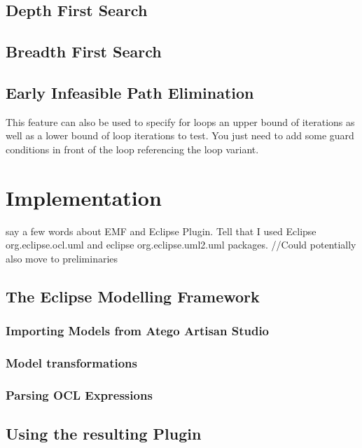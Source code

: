 \subsection{Depth First Search}
\subsection{Breadth First Search}
\subsection{Early Infeasible Path Elimination}
This feature can also be used to specify for loops an upper bound of iterations as well as a lower bound of loop iterations to test. You just need to add some guard conditions in front of the loop referencing the loop variant.
\section{Implementation}
say a few words about EMF and Eclipse Plugin. Tell that I used Eclipse org.eclipse.ocl.uml and eclipse org.eclipse.uml2.uml packages. //Could potentially also move to preliminaries
\subsection{The Eclipse Modelling Framework}
\cite{EMF}
\subsubsection{Importing Models from Atego Artisan Studio}
\subsubsection{Model transformations}
\subsubsection{Parsing OCL Expressions}
\subsection{Using the resulting Plugin}
